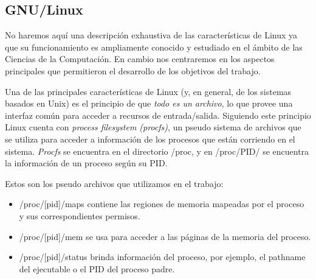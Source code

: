 \subsection{GNU/Linux}
No haremos aquí una descripción exhaustiva de las características de Linux ya que su funcionamiento es ampliamente conocido y estudiado en el ámbito de las Ciencias de la Computación. En cambio nos centraremos en los aspectos principales que permitieron el desarrollo de los objetivos del trabajo.

Una de las principales características de Linux (y, en general, de los sistemas basados en Unix) es el principio de que \textit{todo es un archivo}, lo que provee una interfaz común para acceder a recursos de entrada/salida. Siguiendo este principio Linux cuenta con \textit{process filesystem (procfs)}, un pseudo sistema de archivos que se utiliza para acceder a información de los procesos que están corriendo en el sistema. \textit{Procfs} se encuentra en el directorio /proc, y en /proc/PID/ se encuentra la información de un proceso según su PID.

Estos son los pseudo archivos que utilizamos en el trabajo:

\begin{itemize}
 \item /proc/[pid]/maps contiene las regiones de memoria mapeadas por el proceso y sus correspondientes permisos.
 \item /proc/[pid]/mem se usa para acceder a las páginas de la memoria del proceso.
 \item /proc/[pid]/status brinda información del proceso, por ejemplo, el pathname del ejecutable o el PID del proceso padre.
\end{itemize}
